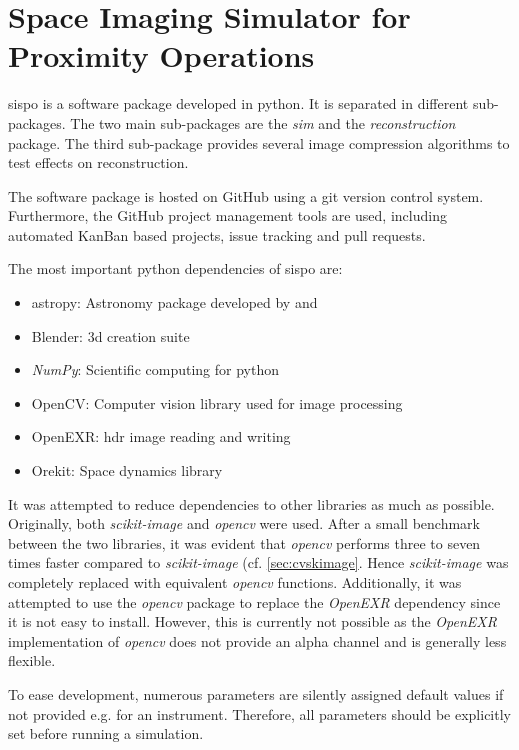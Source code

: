 \section{Space Imaging Simulator for Proximity Operations} \label{sec:sispo}

\gls{sispo} is a software package developed in python. It is separated in different sub-packages. The two main sub-packages are the \textit{sim} and the \textit{reconstruction} package. The third sub-package provides several image compression algorithms to test effects on reconstruction.

The software package is hosted on GitHub using a git version control system. Furthermore, the GitHub project management tools are used, including automated KanBan based projects, issue tracking and pull requests.

The most important python dependencies of \gls{sispo} are:
\begin{itemize}
    \item astropy: Astronomy package developed by \cite{robitaille2013astropy} and \cite{price2018astropy}
    \item Blender: \gls{3d} creation suite \cite{blender}
    \item \textit{NumPy}: Scientific computing for python \cite{oliphant2006guideNumPy}
    \item OpenCV: Computer vision library used for image processing \cite{opencv_library}
    \item OpenEXR: \gls{hdr} image reading and writing \cite{openexr}
    \item Orekit: Space dynamics library \cite{orekit}
\end{itemize}

It was attempted to reduce dependencies to other libraries as much as possible. Originally, both \textit{scikit-image} and \textit{opencv} were used. After a small benchmark between the two libraries, it was evident that \textit{opencv} performs three to seven times faster compared to \textit{scikit-image} (cf. \ref{sec:cvskimage}. Hence \textit{scikit-image} was completely replaced with equivalent \textit{opencv} functions. Additionally, it was attempted to use the \textit{opencv} package to replace the \textit{OpenEXR} dependency since it is not easy to install. However, this is currently not possible as the \textit{OpenEXR} implementation of \textit{opencv} does not provide an alpha channel and is generally less flexible.

To ease development, numerous parameters are silently assigned default values if not provided e.g. for an instrument. Therefore, all parameters should be explicitly set before running a simulation.

